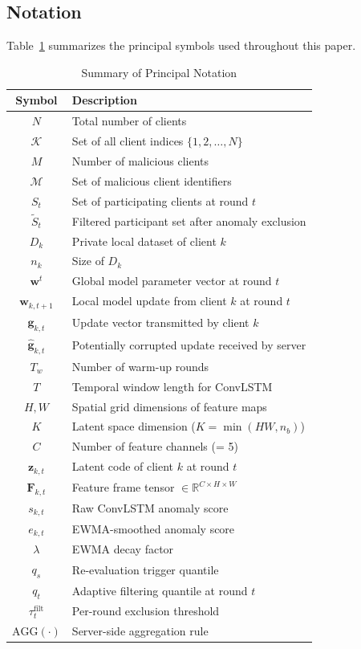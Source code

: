 \documentclass[journal]{IEEEtran}
\begin{document}
\subsection{Notation}

Table~\ref{tab:notation} summarizes the principal symbols used throughout this paper.

\begin{table}[t]
\centering
\caption{Summary of Principal Notation}
\label{tab:notation}
\begin{tabular}{@{}cl@{}}
\toprule
\textbf{Symbol} & \textbf{Description} \\
\midrule
$N$ & Total number of clients \\
$\mathcal{K}$ & Set of all client indices $\{1, 2, \ldots, N\}$ \\
$M$ & Number of malicious clients \\
$\mathcal{M}$ & Set of malicious client identifiers \\
$S_t$ & Set of participating clients at round $t$ \\
$\tilde{S}_t$ & Filtered participant set after anomaly exclusion \\
$D_k$ & Private local dataset of client $k$ \\
$n_k$ & Size of $D_k$ \\
$\mathbf{w}^t$ & Global model parameter vector at round $t$ \\
$\mathbf{w}_{k,t+1}$ & Local model update from client $k$ at round $t$ \\
$\mathbf{g}_{k,t}$ & Update vector transmitted by client $k$ \\
$\hat{\mathbf{g}}_{k,t}$ & Potentially corrupted update received by server \\
$T_w$ & Number of warm-up rounds \\
$T$ & Temporal window length for ConvLSTM \\
$H, W$ & Spatial grid dimensions of feature maps \\
$K$ & Latent space dimension ($K = \min(HW, n_b)$) \\
$C$ & Number of feature channels (= 5) \\
$\mathbf{z}_{k,t}$ & Latent code of client $k$ at round $t$ \\
$\mathbf{F}_{k,t}$ & Feature frame tensor $\in \mathbb{R}^{C \times H \times W}$ \\
$s_{k,t}$ & Raw ConvLSTM anomaly score \\
$e_{k,t}$ & EWMA-smoothed anomaly score \\
$\lambda$ & EWMA decay factor \\
$q_s$ & Re-evaluation trigger quantile \\
$q_t$ & Adaptive filtering quantile at round $t$ \\
$\tau_t^{\text{filt}}$ & Per-round exclusion threshold \\
$\text{AGG}(\cdot)$ & Server-side aggregation rule \\
\bottomrule
\end{tabular}
\end{table}
\end{document}
